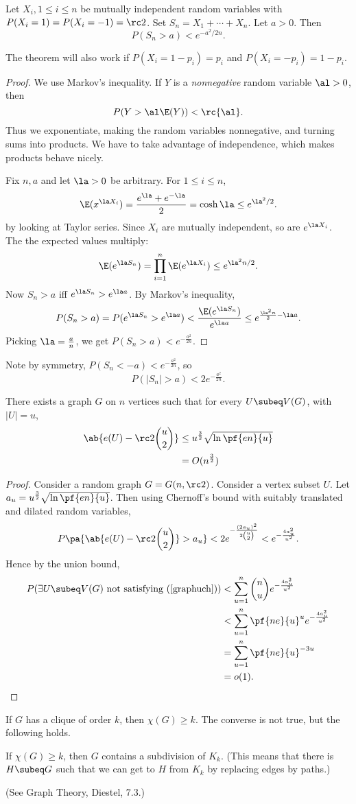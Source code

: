 \begin{thm}
Let $X_i,1\le i\le n$ be mutually independent random variables with $P(X_i=1)=P(X_i=-1)=\rc 2$. Set $S_n=X_1+\cdots +X_n$. Let $a>0$. Then
\[
P(S_n>a)<e^{-a^2/2n}.
\]
\end{thm}
The theorem will also work if $P(X_i=1-p_i)=p_i$ and $P(X_i=-p_i)=1-p_i$.
\begin{proof}
We use Markov's inequality. If $Y$ is a {\it nonnegative} random variable $\al>0$, then
\[
P(Y>\al\E(Y))<\rc{\al}.
\]
Thus we exponentiate, making the random variables nonnegative, and turning sums into products. We have to take advantage of independence, which makes products behave nicely.

Fix $n,a$ and let $\la>0$ be arbitrary. For $1\le i\le n$,
\[
\E(x^{\la X_i})=\frac{e^{\la}+e^{-\la}}{2}=\cosh \la\le e^{\la^2/2}.
\]
by looking at Taylor series. 
Since $X_i$ are mutually independent, so are $e^{\la X_i}$. The the expected values multiply:
\[
\E(e^{\la S_n})=\prod_{i=1}^n \E(e^{\la X_i})\le e^{\la^2n/2}.
\]
Now $S_n>a$ iff $e^{\la S_n}>e^{\la a}$. By Markov's inequality,
\[
P(S_n>a)=P(e^{\la S_n}>e^{\la a})<\frac{\E(e^{\la S_n})}{e^{\la a}}\le e^{\frac{\la^2 n}{2}-\la a}.
\]
Picking $\la=\frac an$, we get $P(S_n>a)<e^{-\frac{a^2}{2n}}$. 
\end{proof}
Note by symmetry, $P(S_n<-a)<e^{-\frac{a^2}{2n}}$, so
\[
P(|S_n|>a)<2e^{-\frac{a^2}{2n}}.
\]
\begin{thm}
There exists a graph $G$ on $n$ vertices such that for every $U\subeq V(G)$, with $|U|=u$, 
\begin{align}
\label{graphuch}
\ab{e(U)-\rc 2\binom{u}{2}}&\le u^{\frac 32} \sqrt{\ln \pf{en}{u}}\\
\nonumber &=O(n^{\frac 32})\end{align}
\end{thm}
\begin{proof}
Consider a random graph $G=G(n,\rc 2)$. Consider a vertex subset $U$.
Let $a_u=u^{\frac 32} \sqrt{\ln \pf{en}{u}}$. 
Then using Chernoff's bound with suitably translated and dilated random variables,
\[
P\pa{\ab{e(U)-\rc 2\binom{u}{2}}>a_u}<2e^{-\frac{(2a_u)^2}{2\binom u2}}
<e^{-\frac{4a_u^2}{u^2}}.
\]
Hence by the union bound,
\begin{align*}
P(\exists U\subeq V(G)\text{ not satisfying~(\ref{graphuch})})
&<\sum_{u=1}^n \binom nu e^{-\frac{4a_u^2}{u^2}}\\
&<\sum_{u=1}^n \pf{ne}{u}^u e^{-\frac{4a_u^2}{u^2}}\\
&=\sum_{u=1}^n \pf{ne}{u}^{-3u}\\
&=o(1).
\end{align*}
\end{proof}
If $G$ has a clique of order $k$, then $\chi(G)\ge k$. The converse is not true, but the following holds.
\begin{conj}[Haj\'os]
If $\chi(G)\ge k$, then $G$ contains a subdivision of $K_k$. (This means that there is $H\subeq G$ such that we can get to $H$ from $K_k$ by replacing edges by paths.)
\end{conj}
(See Graph Theory, Diestel, 7.3.)

